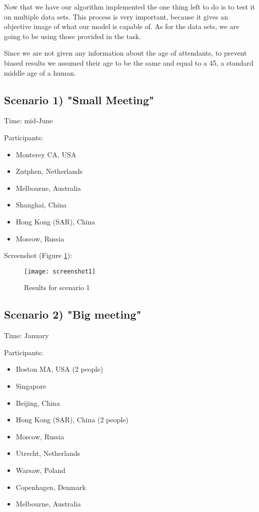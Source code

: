 
Now that we have our algorithm implemented the one thing left to do is to test it on multiple data sets. This process is very important, because it gives an objective image of what our model is capable of. As for the data sets, we are going to be using those provided in the task.

Since we are not given any information about the age of attendants, to prevent biased results we assumed their age to be the same and equal to a 45, a standard middle age of a human.

\subsection{Scenario 1) "Small Meeting"}

Time: mid-June

Participants:
\begin{itemize}[noitemsep,topsep=0pt,parsep=0pt,partopsep=0pt]
\item Monterey CA, USA
\item Zutphen, Netherlands
\item Melbourne, Australia
\item Shanghai, China
\item Hong Kong (SAR), China
\item Moscow, Russia
\end{itemize}

Screenshot (Figure \ref{res:1}):

\begin{figure}[ht]
    \centering
        \texttt{[image: screenshot1]}
    \caption{Results for scenario 1}
    \label{res:1}
\end{figure}

\subsection{Scenario 2) "Big meeting"}

Time: January

Participants:
\begin{itemize}[noitemsep,topsep=0pt,parsep=0pt,partopsep=0pt]
\item Boston MA, USA (2 people)
\item Singapore
\item Beijing, China
\item Hong Kong (SAR), China (2 people)
\item Moscow, Russia
\item Utrecht, Netherlands
\item Warsaw, Poland
\item Copenhagen, Denmark
\item Melbourne, Australia
\end{itemize}

